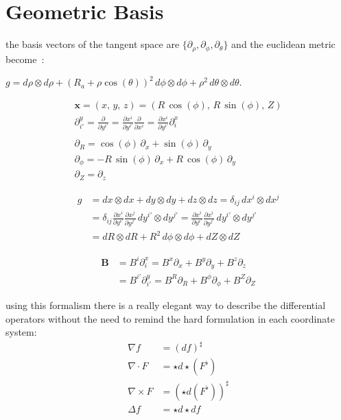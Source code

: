 \appendix

\chapter{Geometric Basis}

the basis vectors of the tangent space are $\{\partial_\rho, \partial_\phi, \partial_\theta\}$ and the euclidean metric become~:

$g = d\rho\otimes d\rho + (R_a+\rho\cos(\theta))^2\, d\phi\otimes d\phi + \rho^2\,d\theta\otimes d\theta $.

\begin{align*}
    \textbf{x} = (x,\,y,\,z) = (R\,\cos(\phi),\,R\,\sin(\phi),\,Z)\\
    \partial_{i'}^y = \frac{\partial}{\partial y^{i'}} = \frac{\partial x^i}{\partial y^{i'}}\frac{\partial}{\partial x^i} = \frac{\partial x^i}{\partial y^{i'}}\partial_i^x\\
    \\
    \partial_R = \cos(\phi)\,\partial_x + \sin(\phi)\,\partial_y\\
    \partial_\phi = -R\,\sin(\phi)\,\partial_x + R\,\cos(\phi)\,\partial_y\\
    \partial_Z = \partial_z
\end{align*}

\begin{align*}
    g &= dx\otimes dx + dy\otimes dy + dz\otimes dz = \delta_{ij}\,dx^i\otimes dx^j\\
    &= \delta_{ij}\frac{\partial x^i}{\partial y^{i'}}\frac{\partial x^j}{\partial y^{j'}}\,dy^{i'}\otimes dy^{j'} = \frac{\partial x^i}{\partial y^{i'}}\frac{\partial x^i}{\partial y^{j'}}\,dy^{i'}\otimes dy^{j'}\\
    &= dR\otimes dR + R^2\,d\phi\otimes d\phi + dZ\otimes dZ
\end{align*}

\begin{align*}
    \textbf{B} &= B^i\partial_i^x = B^x\partial_x + B^y\partial_y + B^z\partial_z\\
     &= B^{i'}\partial_{i'}^y =  B^R\partial_R + B^\phi\partial_\phi + B^Z\partial_Z
\end{align*}

using this formalism there is a really elegant way to describe the differential operators without the need to remind the hard formulation in each coordinate system:
\begin{align*}
    \nabla f &= (df)^\sharp\\
    \nabla\cdot F &= \star d \star (F^\flat)\\
    \nabla\times F &= (\star d (F^\flat))^\sharp\\
    \Delta f &= \star d \star d f\\
\end{align*}

